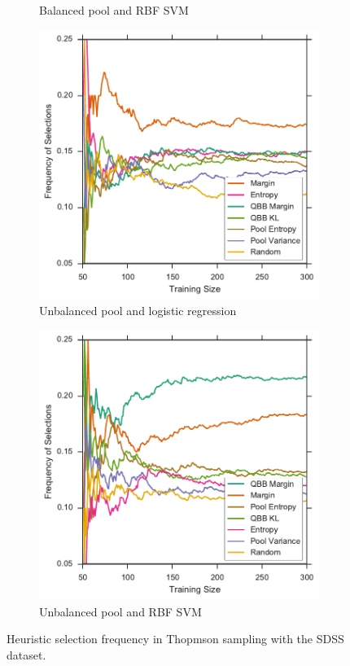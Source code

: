 \begin{figure}[p]
\begin{subfigure}{.5\textwidth}
		\caption{Balanced pool and RBF SVM}
		\label{fig:sdss_br_frequencies}
	\end{subfigure}
	\begin{subfigure}{.5\textwidth}
		\centering
		\includegraphics[width=\textwidth]{figures/5_thompson/sdss_ul_frequencies}
		\caption{Unbalanced pool and logistic regression}
		\label{fig:sdss_ul_frequencies}
	\end{subfigure}%
	\begin{subfigure}{.5\textwidth}
		\centering
		\includegraphics[width=\linewidth]{figures/5_thompson/sdss_ur_frequencies}
		\caption{Unbalanced pool and RBF SVM}
		\label{fig:sdss_ur_frequencies}
	\end{subfigure}
	\caption[Heuristic selection frequency (SDSS)]{
		Heuristic selection frequency in Thopmson sampling with the SDSS dataset.}
	\label{fig:sdss_frequencies}
\end{figure}


